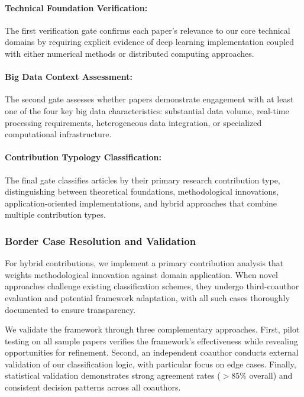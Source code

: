 \documentclass[acmsmall]{acmart}
\begin{document}
\paragraph{Technical Foundation Verification:}
The first verification gate confirms each paper's relevance to our core technical domains by requiring explicit evidence of deep learning implementation coupled with either numerical methods or distributed computing approaches.

\paragraph{Big Data Context Assessment:}
The second gate assesses whether papers demonstrate engagement with at least one of the four key big data characteristics: substantial data volume, real-time processing requirements, heterogeneous data integration, or specialized computational infrastructure.

\paragraph{Contribution Typology Classification:}
The final gate classifies articles by their primary research contribution type, distinguishing between theoretical foundations, methodological innovations, application-oriented implementations, and hybrid approaches that combine multiple contribution types.

\subsubsection{Border Case Resolution and Validation}\label{subsubsec:phase-2-literature-search-and-study-selection:border-case-resolution-and-validation}
For hybrid contributions, we implement a primary contribution analysis that weights methodological innovation against domain application. When novel approaches challenge existing classification schemes, they undergo third-coauthor evaluation and potential framework adaptation, with all such cases thoroughly documented to ensure transparency.

We validate the framework through three complementary approaches. First, pilot testing on all sample papers verifies the framework's effectiveness while revealing opportunities for refinement. Second, an independent coauthor conducts external validation of our classification logic, with particular focus on edge cases. Finally, statistical validation demonstrates strong agreement rates ($> 85\%$ overall) and consistent decision patterns across all coauthors.
\end{document}
